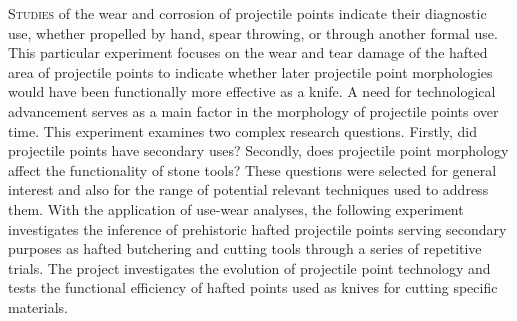 	
	
\lettrine[nindent=0em,lines=3]{S}{tudies} of the wear and corrosion of projectile points indicate their diagnostic use, whether propelled by hand, spear throwing, or through another formal use. This particular experiment focuses on the wear and tear damage of the hafted area of projectile points to indicate whether later projectile point morphologies would have been functionally more effective as a knife. A need for technological advancement serves as a main factor in the morphology of projectile points over time. This experiment examines two complex research questions. Firstly, did projectile points have secondary uses? Secondly, does projectile point morphology affect the functionality of stone tools? These questions were selected for general interest and also for the range of potential relevant techniques used to address them. With the application of use-wear analyses, the following experiment investigates the inference of prehistoric hafted projectile points serving secondary purposes as hafted butchering and cutting tools through a series of repetitive trials. The project investigates the evolution of projectile point technology and tests the functional efficiency of hafted points used as knives for cutting specific materials. 
	
